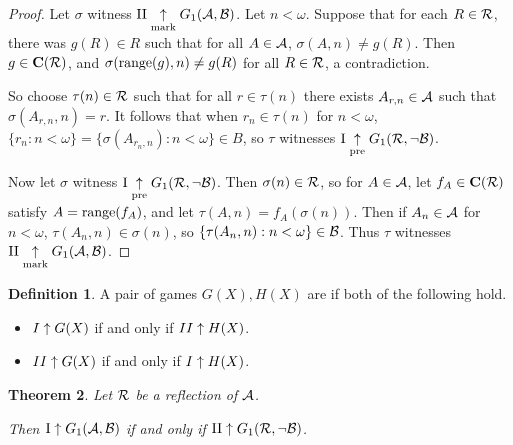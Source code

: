 \documentclass{amsart}
\theoremstyle{plain}
\newtheorem{theorem}{Theorem}
\theoremstyle{definition}
\newtheorem{definition}[theorem]{Definition}
\theoremstyle{remark}
\theoremstyle{plain}
\theoremstyle{definition}
\theoremstyle{remark}
\begin{document}
\begin{proof}
  Let \(\sigma\) witness 
  \(\mathrm{II}\underset{\text{mark}}{\uparrow}G_{1}(\mathcal{A},\mathcal{B})\).
  Let \(n<\omega\). Suppose that for each \(R\in\mathcal{R}\),
  there was \(g(R)\in R\) such that for all \(A\in \mathcal{A}\),
  \(\sigma(A,n)\not=g(R)\). Then \(g\in\mathbf C(\mathcal{R})\),
  and \(\sigma(\text{range}(g),n)\not=g(R)\) for all \(R\in\mathcal{R}\),
  a contradiction.

  So choose \(\tau(n)\in\mathcal{R}\) such that for all \(r\in \tau(n)\)
  there exists \(A_{r,n}\in\mathcal{A}\) such that \(\sigma(A_{r,n},n)=r\).
  It follows that when \(r_n\in\tau(n)\) for \(n<\omega\),
  \(\{r_n:n<\omega\}=\{\sigma(A_{r_n,n}):n<\omega\}\in B\),
  so \(\tau\) witnesses
  \(\mathrm{I}\underset{\text{pre}}{\uparrow}G_{1}(\mathcal{R},\neg\mathcal{B})\).

  Now let \(\sigma\) witness 
  \(\mathrm{I}\underset{\text{pre}}{\uparrow}G_{1}(\mathcal{R},\neg\mathcal{B})\).
  Then \(\sigma(n)\in\mathcal{R}\), so for \(A\in\mathcal{A}\), let
  \(f_A\in\mathbf C(\mathcal{R})\) satisfy \(A=\text{range}(f_A)\),
  and let \(\tau(A,n)=f_A(\sigma(n))\).
  Then if \(A_n\in\mathcal{A}\) for \(n<\omega\), \(\tau(A_n,n)\in\sigma(n)\),
  so \(\{\tau(A_n,n):n<\omega\}\in\mathcal{B}\).
  Thus \(\tau\) witnesses
  \(\mathrm{II}\underset{\text{mark}}{\uparrow}G_{1}(\mathcal{A},\mathcal{B})\).
\end{proof}

\begin{definition}
  A pair of games \(G(X),H(X)\) are  if both
  of the following hold.
  \begin{itemize}
    \item \(I\uparrow G(X)\) if and only if \(II\uparrow H(X)\).
    \item \(II\uparrow G(X)\) if and only if \(I\uparrow H(X)\).
  \end{itemize}
\end{definition}

\begin{theorem}
  Let \(\mathcal{R}\) be a reflection of \(\mathcal{A}\). 

  Then
  \(\mathrm{I}\uparrow G_{1}(\mathcal{A},\mathcal{B})\) if and only if
  \(\mathrm{II}\uparrow G_{1}(\mathcal{R},\neg\mathcal{B})\).
\end{theorem}
\end{document}
